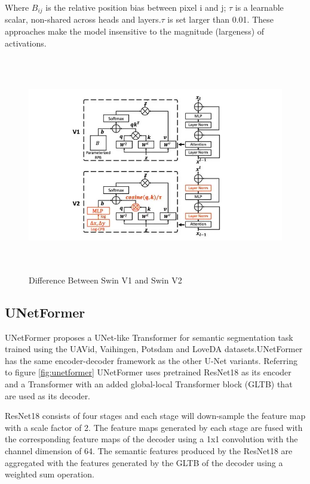 Where $B_{ij}$ is the relative position bias between pixel i and j; $\tau$ is a learnable scalar, non-shared across heads and layers.$\tau$ is set larger than 0.01. These approaches make the model insensitive to the magnitude (largeness) of activations.
\FloatBarrier
\begin{figure}[ht]
\includegraphics[width=13.5cm, height=9.5cm]{images/swin1-vs-swin2.jpg}
\centering
\caption{Difference Between Swin V1 and Swin V2 \protect\cite{swin-v2}}
\label{fig:swin v1 vs v2}
\end{figure}
\FloatBarrier

\subsection{UNetFormer}
UNetFormer \cite{unetformer} proposes a UNet-like Transformer for semantic segmentation task trained using the UAVid, Vaihingen, Potsdam and LoveDA datasets.UNetFormer has the same encoder-decoder framework as the other U-Net variants. Referring to figure \ref{fig:unetformer} UNetFormer uses pretrained ResNet18 as its encoder and a Transformer with an added global-local Transformer block (GLTB) that are used as its decoder. 

ResNet18 consists of four stages and each stage will down-sample the feature map with a scale factor of 2. The feature maps generated by each stage are fused with the corresponding feature maps of the decoder using a 1x1 convolution with the channel dimension of 64. The semantic features produced by the ResNet18 are aggregated with the features generated by the GLTB of the decoder using a weighted sum operation. 

